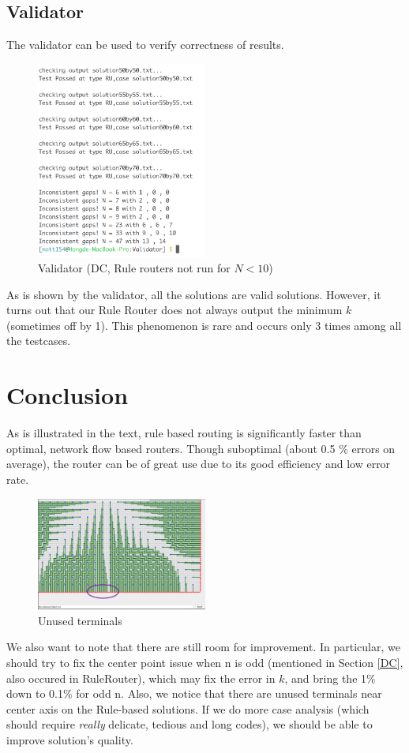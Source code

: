 \documentclass{article}
\begin{document}
\begin{spacing}{1.1}
    \subsection{Validator}
    The validator can be used to verify correctness of results.
    \begin{figure}[H]
        \centering
        \includegraphics[width = 0.5\textwidth]{VAL.png}
        \caption{Validator (DC, Rule routers not run for $N < 10$)}
    \end{figure}
    As is shown by the validator, all the solutions are valid solutions. However, it turns out that our Rule Router does not always output the minimum $k$ (sometimes off by 1). This phenomenon is rare and occurs only 3 times among all the testcases.
    \section{Conclusion}
    As is illustrated in the text, rule based routing is significantly faster than optimal, network flow based routers. Though suboptimal (about 0.5 \% errors on average), the router can be of great use due to its good efficiency and low error rate.

    \begin{figure}[H]
        \centering
        \includegraphics[width = 0.5\textwidth]{CON.png}
        \caption{Unused terminals}
    \end{figure}
    We also want to note that there are still room for improvement. In particular, we should try to fix the center point issue when n is odd (mentioned in Section \ref{DC}, also occured in RuleRouter), which may fix the error in $k$, and bring the 1\% down to 0.1\% for odd n. Also, we notice that there are unused terminals near center axis on the Rule-based solutions.
    If we do more case analysis (which should require \emph{really} delicate, tedious and long codes), we should be able to improve solution's quality.
\end{spacing}
\newpage
\printbibliography
\end{document}
